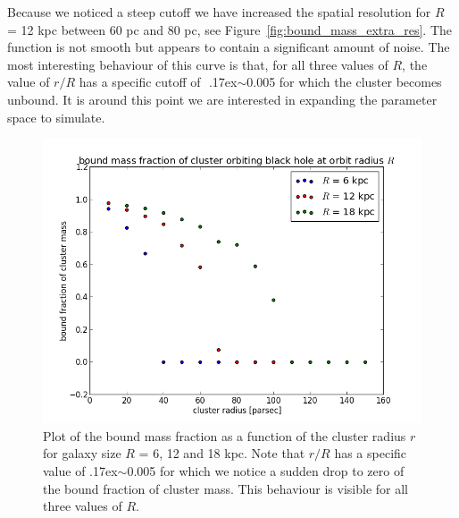 \documentclass{aa}
\newcommand{\mytilde}{\raise.17ex\hbox{$\scriptstyle\mathtt{\sim}$}}
\begin{document}
Because we noticed a steep cutoff we have increased the spatial resolution for $R$ = 12 kpc between 60 pc and 80 pc, see Figure~\ref{fig:bound_mass_extra_res}. The function is not smooth but appears to contain a significant amount of noise. The most interesting behaviour of this curve is that, for all three values of $R$, the value of $r/R$ has a specific cutoff of $
 $ \mytilde 0.005 for which the cluster becomes unbound. It is around this point we are interested in expanding the parameter space to simulate.

   \begin{figure}
   \centering
   \includegraphics[width=\hsize]{img/bound_mass_at_all.png}
      \caption{Plot of the bound mass fraction as a function of the cluster radius $r$ for galaxy size $R$ = 6, 12 and 18 kpc.
      		   Note that $r/R$ has a specific value of \mytilde 0.005 for which we notice a sudden drop to zero of the bound fraction of cluster mass.
		   This behaviour is visible for all three values of $R$.
              }
         \label{fig:bound_mass}
   \end{figure}
   
\end{document}
